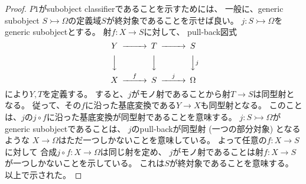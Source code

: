 \documentclass[uplatex]{jsarticle}
\theoremstyle{definition}
\newcommand{\rtot}{\rightarrowtail}
\begin{document}
\begin{proof}
  \(P1\)がsubobject classifierであることを示すためには、
  一般に、generic subobject \(S\rtot \Omega\)の定義域\(S\)が終対象であることを示せば良い。
  \(j:S\rtot \Omega\)をgeneric subobjectとする。
  射\(f:X\to S\)に対して、
  pull-back図式
  \[
  \begin{CD}
    Y @>>> T @>>> S \\
    @VVV @VVV @VV j V \\
    X @>f>> S @>j>> \Omega
  \end{CD}
  \]
  により\(Y,T\)を定義する。
  すると、\(j\)がモノ射であることから射\(T\to S\)は同型射となる。
  従って、その\(f\)に沿った基底変換である\(Y\to X\)も同型射となる。
  このことは、\(j\)の\(j\circ f\)に沿った基底変換が同型射であることを意味する。
  \(j:S\rtot \Omega\)がgeneric subobjectであることは、
  \(j\)のpull-backが同型射 (一つの部分対象) となるような
  \(X\to \Omega\)はただ一つしかないことを意味している。
  よって任意の\(f:X\to S\)に対して
  合成\(j\circ f:X\to \Omega\)は同じ射を定め、
  \(j\)がモノ射であることは射\(f:X\to S\)が一つしかないことを示している。
  これは\(S\)が終対象であることを意味する。
  以上で示された。
\end{proof}
\end{document}
